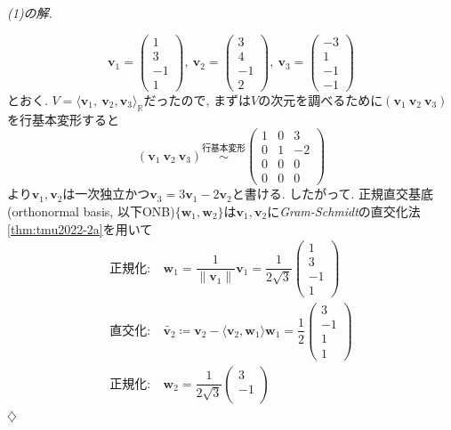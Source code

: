 \documentclass[titlepage]{jsarticle}
\numberwithin{equation}{section}
\newcommand{\R}{\mathbb{R}}%
\newenvironment{kaitou}[1][解]{%
\begin{proofbox}%
\textit{#1. }\ignorespaces
}{%
\hfill$\diamondsuit$%
\end{proofbox}%
}
\begin{document}
\begin{kaitou}[(1)の解]
\[
\bm{v}_1=
\begin{pmatrix}
1\\
3\\
-1\\
1
\end{pmatrix}
,\:
\bm{v}_2=
\begin{pmatrix}
3\\
4\\
-1\\
2
\end{pmatrix}
,\:
\bm{v}_3=
\begin{pmatrix}
-3\\
1\\
-1\\
-1
\end{pmatrix}
\]
とおく. $V = \langle \bm{v}_1,\:\bm{v}_2, \bm{v}_3\rangle_\R$だったので, まずは$V$の次元を調べるために$(\bm{v}_1\:\bm{v}_2\:\bm{v}_3)$を行基本変形すると
\[
(\bm{v}_1\:\bm{v}_2\:\bm{v}_3) \overset{\text{行基本変形}}{\sim}
\begin{pmatrix}
1 & 0 & 3\\
0 & 1 & -2\\
0 & 0 & 0\\
0 & 0 & 0
\end{pmatrix}
\]
より$\bm{v}_1, \bm{v}_2$は一次独立かつ$\bm{v}_3 = 3\bm{v}_1-2\bm{v}_2$と書ける. したがって. 正規直交基底(orthonormal basis, 以下ONB)$\{\bm{w}_1, \bm{w}_2\}$は$\bm{v}_1, \bm{v}_2$に\textit{Gram-Schmidt}の直交化法\ref{thm:tmu2022-2a}を用いて
\begin{align*}
\text{正規化}:\:&\bm{w}_1 = \dfrac{1}{\|\bm{v}_1\|}\bm{v}_1 = 
\dfrac{1}{2\sqrt{3}}
\begin{pmatrix}
1\\
3\\
-1\\
1
\end{pmatrix}
\\
\text{直交化}:\:&\tilde{\bm{v}_2} \coloneq \bm{v}_2 - \langle \bm{v}_2, \bm{w}_1 \rangle\bm{w}_1 =  \dfrac{1}{2}
\begin{pmatrix}
3\\
-1\\
1\\
1
\end{pmatrix}\\
\text{正規化}:\:&\bm{w}_2 = 
\dfrac{1}{2\sqrt{3}}
\begin{pmatrix}
3\\
-1\\

\end{pmatrix}
\end{align*}
\end{kaitou}
\end{document}
